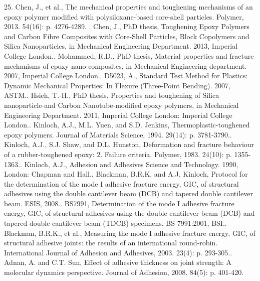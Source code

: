 \documentclass[numbers=noendperiod,chapterprefix=on]{icldt} %
\begin{document}
25.	Chen, J., et al., The mechanical properties and toughening mechanisms of an epoxy polymer modified with polysiloxane-based core-shell particles. Polymer, 2013. 54(16): p. 4276-4289.
.	Chen, J., PhD thesis, Toughening Epoxy Polymers and Carbon Fibre Composites with Core-Shell Particles, Block Copolymers and Silica Nanoparticles, in Mechanical Engineering Department. 2013, Imperial College London..	Mohammed, R.D., PhD thesis, Material properties and fracture mechanisms of epoxy nano-composites, in Mechanical Engineering department. 2007, Imperial College London..	D5023, A., Standard Test Method for Plastics: Dynamic Mechanical Properties: In Flexure (Three-Point Bending). 2007, ASTM..	Hsieh, T.-H., PhD thesis, Properties and toughening of Silica nanoparticle-and Carbon Nanotube-modified epoxy polymers, in Mechanical Engineering Department. 2011, Imperial College London: Imperial College London..	Kinloch, A.J., M.L. Yuen, and S.D. Jenkins, Thermoplastic-toughened epoxy polymers. Journal of Materials Science, 1994. 29(14): p. 3781-3790..	Kinloch, A.J., S.J. Shaw, and D.L. Hunston, Deformation and fracture behaviour of a rubber-toughened epoxy: 2. Failure criteria. Polymer, 1983. 24(10): p. 1355-1363..	Kinloch, A.J., Adhesion and Adhesives Science and Technology. 1990, London: Chapman and Hall..	Blackman, B.R.K. and A.J. Kinloch, Protocol for the determination of the mode I adhesive fracture energy, GIC, of structural adhesives using the double cantilever beam (DCB) and tapered double cantilever beam. ESIS, 2008..	BS7991, Determination of the mode I adhesive fracture energy, GIC, of structural adhesives using the double cantilever beam (DCB) and tapered double cantilever beam (TDCB) specimens. BS 7991:2001, BSI..	Blackman, B.R.K., et al., Measuring the mode I adhesive fracture energy, GIC, of structural adhesive joints: the results of an international round-robin. International Journal of Adhesion and Adhesives, 2003. 23(4): p. 293-305..	Adnan, A. and C.T. Sun, Effect of adhesive thickness on joint strength: A molecular dynamics perspective. Journal of Adhesion, 2008. 84(5): p. 401-420.\newline
\end{document}
